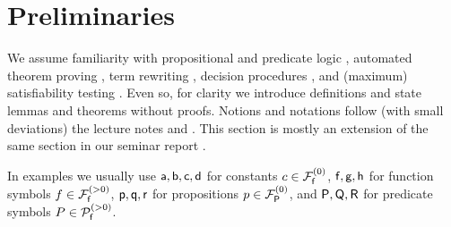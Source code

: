 
\section{Preliminaries}

We assume familiarity with propositional and predicate logic \cite{Huth:2004:LCS:975331}, 
automated theorem proving \cite{Fitting:1996:FLA:230183}, 
term rewriting \cite{Baader:1998:TR:280474}, 
decision procedures \cite{Kroening:2008:DPA:1391237}, 
and (maximum) satisfiability testing \cite{Biere:2009:HSV:1550723}.
Even so, for clarity we introduce
definitions and state lemmas and theorems without proofs.
Notions and notations follow (with small deviations) the lecture notes \cite{AM2015tr} and \cite{GM2013ar}.
This section is mostly an extension of the same section in our seminar report \cite{axm:SR2}.





In examples we usually use ${\mathsf a},{\mathsf b},{\mathsf c},{\mathsf d}$ for constants $c\in{{\mathcal F}_{\mathsf f}^{(0)}}$,
${\mathsf f},{\mathsf g},{\mathsf h}$ for function symbols $f\in{{\mathcal F}_{\mathsf f}^{(>0)}}$,
${\mathsf p},{\mathsf q},{\mathsf r}$ for propositions $p\in{{\mathcal F}_{\mathsf P}^{(0)}}$, and 
${\mathsf P},{\mathsf Q},{\mathsf R}$ for predicate symbols $P\in{{\mathcal P}_{\mathsf f}^{(>0)}}$.







